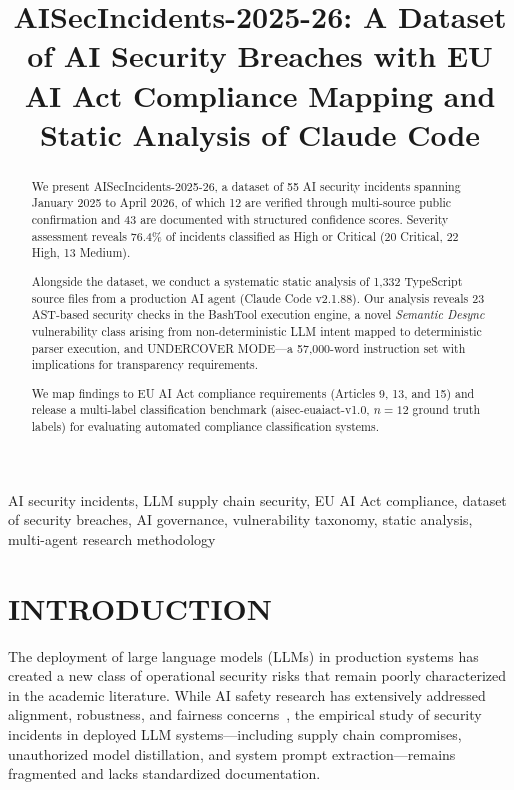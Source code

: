 \documentclass[10pt,conference]{IEEEtran}
\begin{document}
\title{AISecIncidents-2025-26: A Dataset of AI Security Breaches with EU AI Act Compliance Mapping and Static Analysis of Claude Code}

\author{
}

\maketitle

\begin{abstract}
We present AISecIncidents-2025-26, a dataset of 55 AI security incidents spanning January 2025 to April 2026, of which 12 are verified through multi-source public confirmation and 43 are documented with structured confidence scores. Severity assessment reveals 76.4\% of incidents classified as High or Critical (20 Critical, 22 High, 13 Medium).

Alongside the dataset, we conduct a systematic static analysis of 1,332 TypeScript source files from a production AI agent (Claude Code v2.1.88). Our analysis reveals 23 AST-based security checks in the BashTool execution engine, a novel \emph{Semantic Desync} vulnerability class arising from non-deterministic LLM intent mapped to deterministic parser execution, and UNDERCOVER MODE---a 57,000-word instruction set with implications for transparency requirements.

We map findings to EU AI Act compliance requirements (Articles 9, 13, and 15) and release a multi-label classification benchmark (aisec-euaiact-v1.0, $n=12$ ground truth labels) for evaluating automated compliance classification systems.
\end{abstract}

\begin{IEEEkeywords}
AI security incidents, LLM supply chain security, EU AI Act compliance, dataset of security breaches, AI governance, vulnerability taxonomy, static analysis, multi-agent research methodology
\end{IEEEkeywords}

\section{INTRODUCTION}
\label{sec:introduction}

The deployment of large language models (LLMs) in production systems has created a new class of operational security risks that remain poorly characterized in the academic literature. While AI safety research has extensively addressed alignment, robustness, and fairness concerns~\cite{papernot2019}, the empirical study of security incidents in deployed LLM systems---including supply chain compromises, unauthorized model distillation, and system prompt extraction---remains fragmented and lacks standardized documentation.
\end{document}
